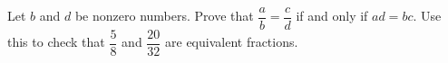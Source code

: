 Let $b$ and $d$ be nonzero numbers. Prove that $\dfrac {a}{b}=\dfrac {c}{d}$ if and only if $ad=bc$. Use this to check that $\dfrac{5}{8}$ and $\dfrac{20}{32}$ are equivalent fractions.
